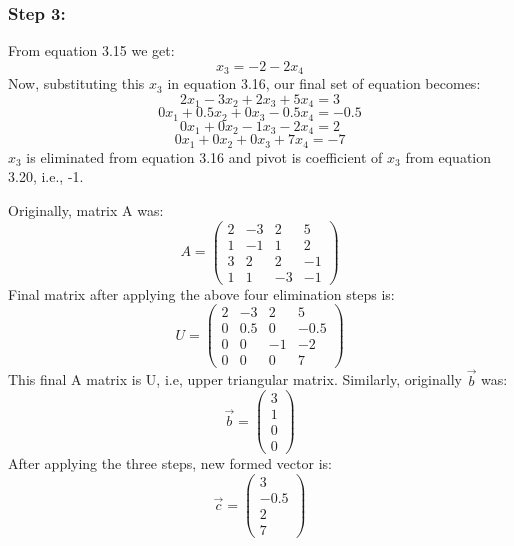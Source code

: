 \documentclass[12pt, oneside,table]{report}
\newcommand{\?}{\stackrel{?}{=}}
\theoremstyle{definition}
\begin{document}
\subsubsection{Step 3:}
From equation 3.15 we get:
\begin{equation}
    x_{3}=-2-2x_{4}
\end{equation}
Now, substituting this $x_{3}$ in equation 3.16, our final set of equation becomes:
\begin{equation}
    2x_{1}-3x_{2}+2x_{3}+5x_{4}=3
\end{equation}
\begin{equation}
    0x_{1}+0.5x_{2}+0x_{3}-0.5x_{4}=-0.5
\end{equation}
\begin{equation}
    0x_{1}+0x_{2}-1x_{3}-2x_{4}=2
\end{equation}
\begin{equation}
    0x_{1}+0x_{2}+0x_{3}+7x_{4}=-7
\end{equation}
 $x_{3}$ is eliminated from equation 3.16 and pivot is coefficient of $x_{3}$ from equation 3.20, i.e., -1.

Originally, matrix A was:
\begin{equation}
    A=\begin{pmatrix}
       2 & -3 & 2 & 5\\
       1 & -1 & 1 & 2\\
       3 & 2 & 2 & -1\\
       1 & 1 & -3 & -1
    \end{pmatrix}
\end{equation}
Final matrix after applying the above four elimination steps is:
\begin{equation}
    U = \begin{pmatrix}
      2&-3&2&5\\
      0&0.5&0&-0.5\\
      0&0&-1&-2\\
      0&0&0&7
     \end{pmatrix} 
\end{equation}
This final A matrix is U, i.e, upper triangular matrix.
Similarly, originally $\overrightarrow{b}$ was:
\begin{equation}
    \overrightarrow{b}=\begin{pmatrix}
    3\\
    1\\
    0\\
    0
    \end{pmatrix}
\end{equation}
After applying the three steps, new formed vector is:
\begin{equation}
    \overrightarrow{c}=\begin{pmatrix}
    3\\
    -0.5\\
    2\\
    7
    \end{pmatrix}
\end{equation}
\end{document}
